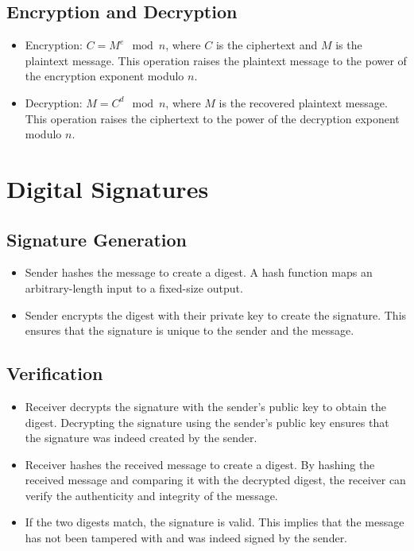 \documentclass[11pt]{article}
\begin{document}
\subsection{Encryption and Decryption}
\begin{itemize}
    \item Encryption: $C = M^e \mod n$, where $C$ is the ciphertext and $M$ is the plaintext message. This operation raises the plaintext message to the power of the encryption exponent modulo $n$.
    \item Decryption: $M = C^d \mod n$, where $M$ is the recovered plaintext message. This operation raises the ciphertext to the power of the decryption exponent modulo $n$.
\end{itemize}

\section{Digital Signatures}
\subsection{Signature Generation}
\begin{itemize}
    \item Sender hashes the message to create a digest. A hash function maps an arbitrary-length input to a fixed-size output.
    \item Sender encrypts the digest with their private key to create the signature. This ensures that the signature is unique to the sender and the message.
\end{itemize}

\subsection{Verification}
\begin{itemize}
    \item Receiver decrypts the signature with the sender’s public key to obtain the digest. Decrypting the signature using the sender's public key ensures that the signature was indeed created by the sender.
    \item Receiver hashes the received message to create a digest. By hashing the received message and comparing it with the decrypted digest, the receiver can verify the authenticity and integrity of the message.
    \item If the two digests match, the signature is valid. This implies that the message has not been tampered with and was indeed signed by the sender.
\end{itemize}
\end{document}
